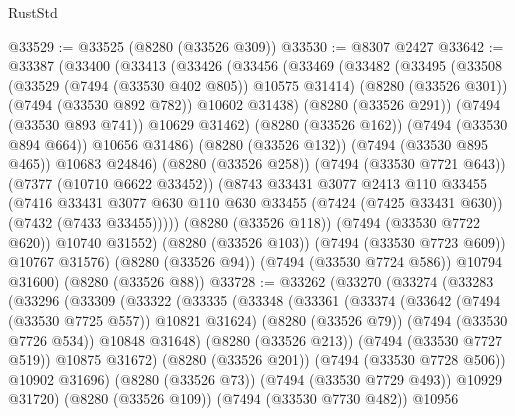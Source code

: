 \begin{lexlean}{RustStd}
\begin{coremodule}
@33529 := @33525 (@8280 (@33526 @309))
@33530 := @8307 @2427
@33642 := @33387
    (@33400
      (@33413
        (@33426
          (@33456
            (@33469
              (@33482
                (@33495
                  (@33508
                    (@33529 (@7494 (@33530 @402 @805)) @10575 @31414)
                    (@8280 (@33526 @301))
                    (@7494 (@33530 @892 @782))
                    @10602
                    @31438)
                  (@8280 (@33526 @291))
                  (@7494 (@33530 @893 @741))
                  @10629
                  @31462)
                (@8280 (@33526 @162))
                (@7494 (@33530 @894 @664))
                @10656
                @31486)
              (@8280 (@33526 @132))
              (@7494 (@33530 @895 @465))
              @10683
              @24846)
            (@8280 (@33526 @258))
            (@7494 (@33530 @7721 @643))
            (@7377 (@10710 @6622 @33452))
            (@8743
              @33431
              @3077
              @2413
              @110
              @33455
              (@7416
                @33431
                @3077
                @630
                @110
                @630
                @33455
                (@7424 (@7425 @33431 @630))
                (@7432 (@7433 @33455)))))
          (@8280 (@33526 @118))
          (@7494 (@33530 @7722 @620))
          @10740
          @31552)
        (@8280 (@33526 @103))
        (@7494 (@33530 @7723 @609))
        @10767
        @31576)
      (@8280 (@33526 @94))
      (@7494 (@33530 @7724 @586))
      @10794
      @31600)
    (@8280 (@33526 @88))
@33728 := @33262
    (@33270
      (@33274
        (@33283
          (@33296
            (@33309
              (@33322
                (@33335
                  (@33348
                    (@33361
                      (@33374
                        (@33642 (@7494 (@33530 @7725 @557)) @10821 @31624)
                        (@8280 (@33526 @79))
                        (@7494 (@33530 @7726 @534))
                        @10848
                        @31648)
                      (@8280 (@33526 @213))
                      (@7494 (@33530 @7727 @519))
                      @10875
                      @31672)
                    (@8280 (@33526 @201))
                    (@7494 (@33530 @7728 @506))
                    @10902
                    @31696)
                  (@8280 (@33526 @73))
                  (@7494 (@33530 @7729 @493))
                  @10929
                  @31720)
                (@8280 (@33526 @109))
                (@7494 (@33530 @7730 @482))
                @10956

\end{coremodule}
\end{lexlean}
